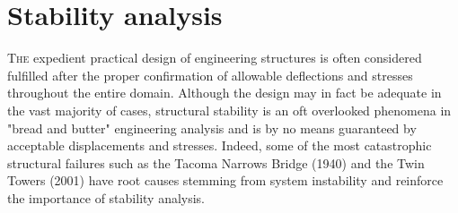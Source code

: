 



\chapter{Stability analysis}
\label{chap:chapter_2_2}

\renewcommand{\Thema}{Stability analysis}

\lettrine[lines=2]{T}{he} expedient practical design of engineering structures is often considered fulfilled after the proper confirmation of allowable deflections and stresses throughout the entire domain. Although the design may in fact be adequate in the vast majority of cases, structural stability is an oft overlooked phenomena in "bread and butter" engineering analysis and is by no means guaranteed by acceptable displacements and stresses. Indeed, some of the most catastrophic structural failures such as the Tacoma Narrows Bridge (1940) and the Twin Towers (2001) have root  causes stemming from system instability and reinforce the importance of stability analysis.

